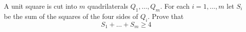 A unit square is cut into $m$ quadrilaterals $Q_1,\ldots ,Q_m$. For each $i=1,\ldots ,m$ let $S_i$ be the sum of the squares of the four sides of $Q_i$. Prove that\[S_1+\ldots +S_m\ge 4\]